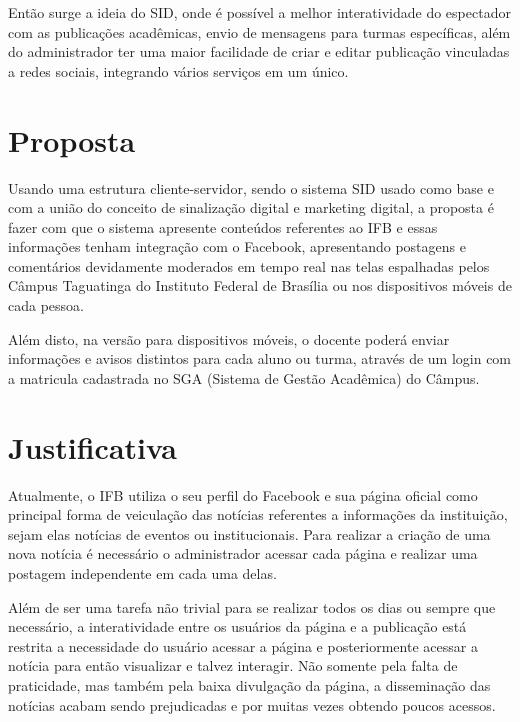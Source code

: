 Então surge a ideia do SID, onde é possível a melhor interatividade do espectador com as publicações acadêmicas, envio de mensagens para turmas específicas, além do administrador ter uma maior facilidade de criar e editar publicação vinculadas a redes sociais, integrando vários serviços em um único.

\section{Proposta}
Usando uma estrutura cliente-servidor, sendo o sistema SID usado como base e com a união do conceito de sinalização digital e marketing digital, a proposta é fazer com que o sistema apresente conteúdos referentes ao IFB e essas informações tenham integração com o Facebook, apresentando postagens e comentários devidamente moderados em tempo real nas  telas espalhadas pelos Câmpus Taguatinga do Instituto Federal de Brasília ou nos dispositivos móveis de cada pessoa. 

Além disto, na versão para dispositivos móveis, o docente poderá enviar informações e avisos distintos para cada aluno ou turma, através de um login com a matricula cadastrada no SGA (Sistema de Gestão Acadêmica) do Câmpus.

\section{Justificativa}
Atualmente, o IFB utiliza o seu perfil do Facebook e sua página oficial como principal forma de veiculação das notícias referentes a informações da instituição, sejam elas notícias de eventos ou institucionais. Para realizar a criação de uma nova notícia é necessário o administrador acessar cada página e realizar uma postagem independente em cada uma delas. 

Além de ser uma tarefa não trivial para se realizar todos os dias ou sempre que necessário, a interatividade entre os usuários da página e a
publicação está restrita a necessidade do usuário acessar a página e posteriormente acessar a notícia para então visualizar e talvez interagir. Não somente pela falta de praticidade, mas também pela baixa divulgação da página, a disseminação das notícias acabam sendo prejudicadas e por muitas vezes obtendo poucos acessos.

